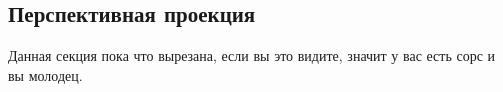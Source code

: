 \subsection{Перспективная проекция}

Данная секция пока что вырезана, если вы это видите, значит у вас есть сорс и вы молодец.
